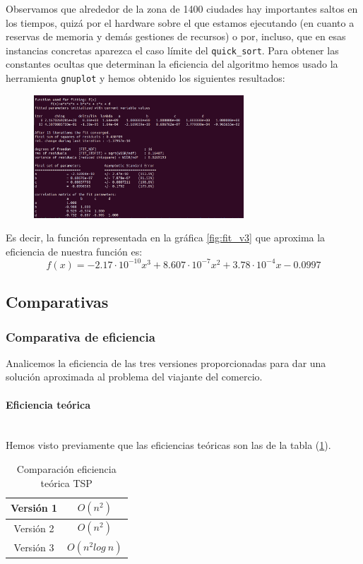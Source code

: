 \documentclass{article}
\newcommand{\myparagraph}[1]{\paragraph{#1}\mbox{}\\}
\begin{document}
Observamos que alrededor de la zona de 1400 ciudades hay
importantes saltos en los tiempos, quizá por el hardware
sobre el que estamos ejecutando (en cuanto a reservas de memoria y demás gestiones de recursos) o por, incluso, que 
en esas instancias concretas aparezca el caso límite del \verb|quick_sort|. Para obtener las constantes ocultas que determinan la eficiencia del algoritmo hemos usado la herramienta \verb|gnuplot| y hemos obtenido los siguientes resultados:
\begin{figure}[H]
    \centering
    \includegraphics[width=0.7\textwidth]{Problema4/imagenes/captura_gnuplot_dani.png}
\end{figure}
Es decir, la función representada en la gráfica \ref{fig:fit_v3} que aproxima la eficiencia de nuestra función es:
\begin{equation*}
    f(x) = -2.17\cdot 10^{-10}x^3 + 8.607\cdot 10^{-7}x^2 + 
    3.78\cdot 10^{-4}x - 0.0997
\end{equation*} 

\subsection{Comparativas}
\subsubsection{Comparativa de eficiencia}

Analicemos la eficiencia de las tres versiones proporcionadas para dar una solución aproximada al problema del viajante del comercio.

\myparagraph{Eficiencia teórica}

Hemos visto previamente que las eficiencias teóricas son las de la tabla (\ref{tab:cmp_et}).
\begin{table}[hbt!]
    \centering
    \begin{tabular}{|c|c|}
        \hline
        Versión 1 & $O(n^{2})$ \\
        \hline
        Versión 2 & $O(n^{2})$ \\
        \hline
        Versión 3 & $O(n^{2}log\:n)$ \\
        \hline
    \end{tabular}
    \caption{Comparación eficiencia teórica TSP}
    \label{tab:cmp_et}
\end{table}
\end{document}
